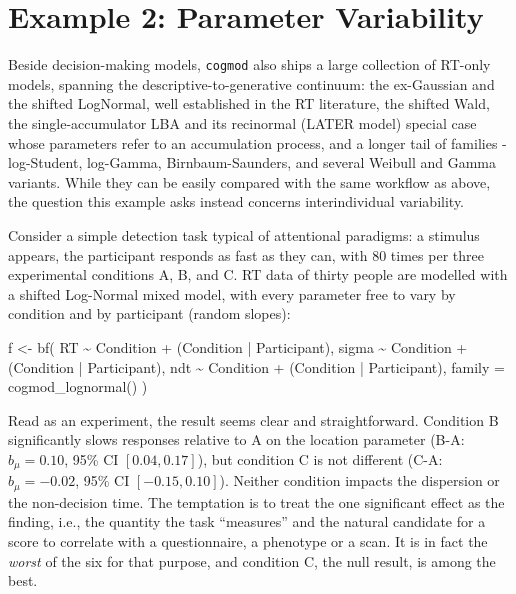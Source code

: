 \documentclass[
  jou,
  floatsintext,
  longtable,
  nolmodern,
  notxfonts,
  notimes,
  12pt,
  colorlinks=true,linkcolor=blue,citecolor=blue,urlcolor=blue]{apa7}
\newenvironment{Shaded}{\begin{snugshade}}{\end{snugshade}}
\newcommand{\AttributeTok}[1]{\textcolor[rgb]{0.40,0.45,0.13}{#1}}
\newcommand{\FunctionTok}[1]{\textcolor[rgb]{0.28,0.35,0.67}{#1}}
\newcommand{\NormalTok}[1]{\textcolor[rgb]{0.00,0.23,0.31}{#1}}
\newcommand{\OtherTok}[1]{\textcolor[rgb]{0.00,0.23,0.31}{#1}}
\newcommand{\SpecialCharTok}[1]{\textcolor[rgb]{0.37,0.37,0.37}{#1}}
\begin{document}
\section{Example 2: Parameter
Variability}\label{example-2-parameter-variability}

Beside decision-making models, \texttt{cogmod} also ships a large
collection of RT-only models, spanning the descriptive-to-generative
continuum: the ex-Gaussian and the shifted LogNormal, well established
in the RT literature, the shifted Wald, the single-accumulator LBA and
its recinormal (LATER model) special case whose parameters refer to an
accumulation process, and a longer tail of families - log-Student,
log-Gamma, Birnbaum-Saunders, and several Weibull and Gamma variants.
While they can be easily compared with the same workflow as above, the
question this example asks instead concerns interindividual variability.

Consider a simple detection task typical of attentional paradigms: a
stimulus appears, the participant responds as fast as they can, with 80
times per three experimental conditions A, B, and C. RT data of thirty
people are modelled with a shifted Log-Normal mixed model, with every
parameter free to vary by condition and by participant (random slopes):

\begin{Shaded}
\begin{Highlighting}[]
\NormalTok{f }\OtherTok{\textless{}{-}} \FunctionTok{bf}\NormalTok{(}
\NormalTok{  RT }\SpecialCharTok{\textasciitilde{}}\NormalTok{ Condition }\SpecialCharTok{+}
\NormalTok{    (Condition }\SpecialCharTok{|}\NormalTok{ Participant),}
\NormalTok{  sigma }\SpecialCharTok{\textasciitilde{}}\NormalTok{ Condition }\SpecialCharTok{+}
\NormalTok{    (Condition }\SpecialCharTok{|}\NormalTok{ Participant),}
\NormalTok{  ndt }\SpecialCharTok{\textasciitilde{}}\NormalTok{ Condition }\SpecialCharTok{+}
\NormalTok{    (Condition }\SpecialCharTok{|}\NormalTok{ Participant),}
  \AttributeTok{family =} \FunctionTok{cogmod\_lognormal}\NormalTok{()}
\NormalTok{)}
\end{Highlighting}
\end{Shaded}

Read as an experiment, the result seems clear and straightforward.
Condition B significantly slows responses relative to A on the location
parameter (B-A: \(b_\mu = 0.10\), 95\% CI \([0.04, 0.17]\)), but
condition C is not different (C-A: \(b_\mu = -0.02\), 95\% CI
\([-0.15, 0.10]\)). Neither condition impacts the dispersion or the
non-decision time. The temptation is to treat the one significant effect
as the finding, i.e., the quantity the task ``measures'' and the natural
candidate for a score to correlate with a questionnaire, a phenotype or
a scan. It is in fact the \emph{worst} of the six for that purpose, and
condition C, the null result, is among the best.
\end{document}
